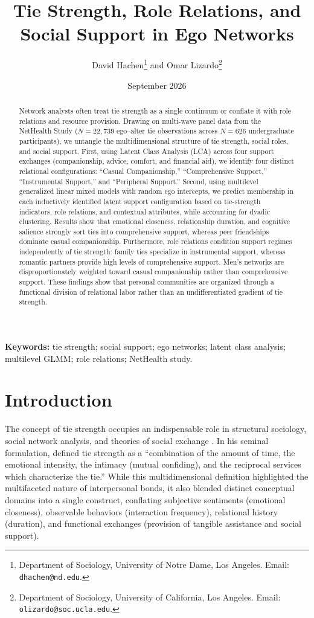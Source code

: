 \documentclass[12pt]{article}
\title{\textbf{Tie Strength, Role Relations, and Social Support in Ego Networks}}
\author{
  David Hachen\thanks{Department of Sociology, University of Notre Dame, Los Angeles. Email: \texttt{dhachen@nd.edu}.} and Omar Lizardo\thanks{Department of Sociology, University of California, Los Angeles. Email: \texttt{olizardo@soc.ucla.edu}.}
}
\date{September 2026}
\begin{document}
\maketitle

\begin{abstract}
Network analysts often treat tie strength as a single continuum or conflate it with role relations and resource provision. Drawing on multi-wave panel data from the NetHealth Study ($N = 22,739$ ego--alter tie observations across $N = 626$ undergraduate participants), we untangle the multidimensional structure of tie strength, social roles, and social support. First, using Latent Class Analysis (LCA) across four support exchanges (companionship, advice, comfort, and financial aid), we identify four distinct relational configurations: ``Casual Companionship,'' ``Comprehensive Support,'' ``Instrumental Support,'' and ``Peripheral Support.'' Second, using multilevel generalized linear mixed models with random ego intercepts, we predict membership in each inductively identified latent support configuration based on tie-strength indicators, role relations, and contextual attributes, while accounting for dyadic clustering. Results show that emotional closeness, relationship duration, and cognitive salience strongly sort ties into comprehensive support, whereas peer friendships dominate casual companionship. Furthermore, role relations condition support regimes independently of tie strength: family ties specialize in instrumental support, whereas romantic partners provide high levels of comprehensive support. Men's networks are disproportionately weighted toward casual companionship rather than comprehensive support. These findings show that personal communities are organized through a functional division of relational labor rather than an undifferentiated gradient of tie strength.
\end{abstract}

\vspace{1em}
\noindent \textbf{Keywords:} tie strength; social support; ego networks; latent class analysis; multilevel GLMM; role relations; NetHealth study.

\clearpage

\section{Introduction}

The concept of tie strength occupies an indispensable role in structural sociology, social network analysis, and theories of social exchange \citep{borgatti2009network, granovetter1973strength, kitts2014beyond, marsden1984measuring}. In his seminal formulation, \citet[p.~1361]{granovetter1973strength} defined tie strength as a ``combination of the amount of time, the emotional intensity, the intimacy (mutual confiding), and the reciprocal services which characterize the tie.'' While this multidimensional definition highlighted the multifaceted nature of interpersonal bonds, it also blended distinct conceptual domains into a single construct, conflating subjective sentiments (emotional closeness), observable behaviors (interaction frequency), relational history (duration), and functional exchanges (provision of tangible assistance and social support).
\end{document}

